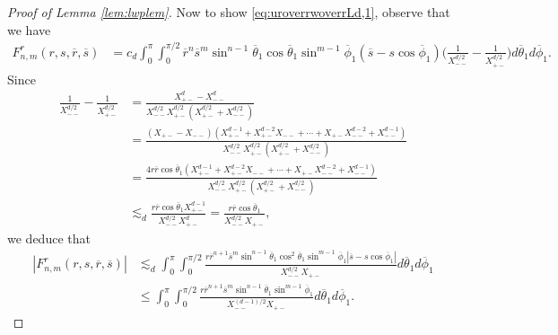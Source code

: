 \documentclass[11pt]{amsart}
\newcommand{\Green}[1]{\begingroup\color{green} #1\endgroup}
\theoremstyle{definition}
\theoremstyle{remark}
\numberwithin{equation}{section}
\numberwithin{equation}{section}
\newcommand{\br}[1]{\overline{#1}}
\newcommand{\0}{\emptyset}
\newcommand{\tht}{\theta}
\begin{document}
\begin{proof}[Proof of Lemma \ref{lem:lwplem}]
Now to show \eqref{eq:uroverrwoverrLd,1}, observe that we have
\begin{equation}
\begin{aligned}
F_{n,m}^{r}(r,s,\br{r},\br{s})%
&=c_{d}\int_{0}^{\pi}\int_{0}^{\pi/2}%
\br{r}^{n}\br{s}^{m}\sin^{n-1}\br{\tht}_{1}\cos\br{\tht}_{1}\sin^{m-1}\br{\phi}_{1}%
(\br{s}-s\cos\br{\phi}_{1})\bigg(\frac{1}{X_{--}^{d/2}}-\frac{1}{X_{+-}^{d/2}}\bigg)d\br{\tht}_{1}d\br{\phi}_{1}.
\end{aligned}
\end{equation}
Since
\begin{equation}
\begin{aligned}
\frac{1}{X_{--}^{d/2}}-\frac{1}{X_{+-}^{d/2}} &= \frac{X_{+-}^{d}-X_{--}^{d}}{X_{--}^{d/2}X_{+-}^{d/2}(X_{+-}^{d/2}+X_{--}^{d/2})}\\
&=\frac{(X_{+-}-X_{--})(X_{+-}^{d-1}+X_{+-}^{d-2}X_{--}+\cdots+X_{+-}X_{--}^{d-2}+X_{--}^{d-1})}{X_{--}^{d/2}X_{+-}^{d/2}(X_{+-}^{d/2}+X_{--}^{d/2})}\\
&=\frac{4r\br{r}\cos\br{\tht}_{1}(X_{+-}^{d-1}+X_{+-}^{d-2}X_{--}+\cdots+X_{+-}X_{--}^{d-2}+X_{--}^{d-1})}{X_{--}^{d/2}X_{+-}^{d/2}(X_{+-}^{d/2}+X_{--}^{d/2})} \\
&\lesssim_{d} \frac{r\br{r}\cos\br{\tht}_{1}X_{+-}^{d-1}}{X_{--}^{d/2}X_{+-}^{d}}=\frac{r\br{r}\cos\br{\tht}_{1}}{X_{--}^{d/2}X_{+-}},
\end{aligned}
\end{equation}
we deduce that
\begin{equation}
\begin{aligned}
|F_{n,m}^{r}(r,s,\br{r},\br{s})|&\lesssim_{d} \int_{0}^{\pi}\int_{0}^{\pi/2}%
\frac{r\br{r}^{n+1}\br{s}^{m}\sin^{n-1}\br{\tht}_{1}\cos^{2}\br{\tht}_{1}\sin^{m-1}\br{\phi}_{1}%
|\br{s}-s\cos\br{\phi}_{1}|}{X_{--}^{d/2}X_{+-}}d\br{\tht}_{1}d\br{\phi}_{1}\\
&\leq \int_{0}^{\pi}\int_{0}^{\pi/2}%
\frac{r\br{r}^{n+1}\br{s}^{m} \sin^{n-1}\br{\tht}_{1}\sin^{m-1}\br{\phi}_{1}}{X_{--}^{(d-1)/2}X_{+-}}d\br{\tht}_{1}d\br{\phi}_{1}.
\end{aligned}

\end{equation}
\end{proof}
\end{document}
